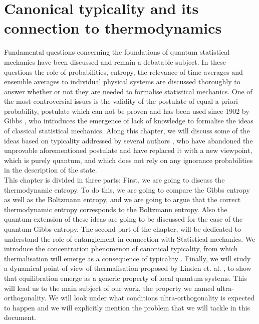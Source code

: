 \chapter{Canonical typicality and its connection to thermodynamics}

\noindent Fundamental questions concerning the foundations of quantum statistical mechanics have been discussed and remain a debatable subject\cite{singh_foundations_2013}. In these questions the role of probabilities, entropy, the relevance of time averages and ensemble averages to individual physical systems are discussed thoroughly \cite{gemmer_quantum_2004} to answer whether or not they are needed to formalise statistical mechanics. One of the most controversial issues is the validity of the postulate of equal a priori probability, postulate which can not be proven\cite{singh_foundations_2013} and has been used since 1902 by Gibbs \cite{gibbs_elementary_1902}, who introduces the emergence of lack of knowledge to formalise the ideas of classical statistical mechanics. Along this chapter, we will discuss some of the ideas based on typicality addressed by several authors \cite{gemmer_quantum_2004, goldstein_canonical_2006, popescu_entanglement_2006}, who have abandoned the unprovable aforementioned postulate and have replaced it with a new viewpoint, which is purely quantum, and which does not rely on any ignorance probabilities in the description of the state.\\
\indent This chapter is divided in three parts: First, we are going to discuss the thermodynamic entropy. To do this, we are going to compare the Gibbs entropy as well as the Boltzmann entropy, and we are going to argue that the correct thermodynamic entropy corresponds to the Boltzmann entropy. Also the quantum extension of these ideas are going to be discussed for the case of the quantum Gibbs entropy. The second part of the chapter, will be dedicated to understand the role of entanglement in connection with Statistical mechanics. We introduce the concentration phenomenon of canonical typicality, from which thermalisation will emerge as a consequence of typicality \cite{popescu_entanglement_2006, popescu_foundations_2005}. Finally, we will study a dynamical point of view of thermalisation proposed by Linden et. al. \cite{linden_quantum_2009}, to show that equilibration emerge as a generic property of local quantum systems. This will lead us to the main subject of our work, the property we named ultra-orthogonality. We will look under what conditions ultra-orthogonality is expected to happen and we will explicitly mention the problem that we will tackle in this document.


